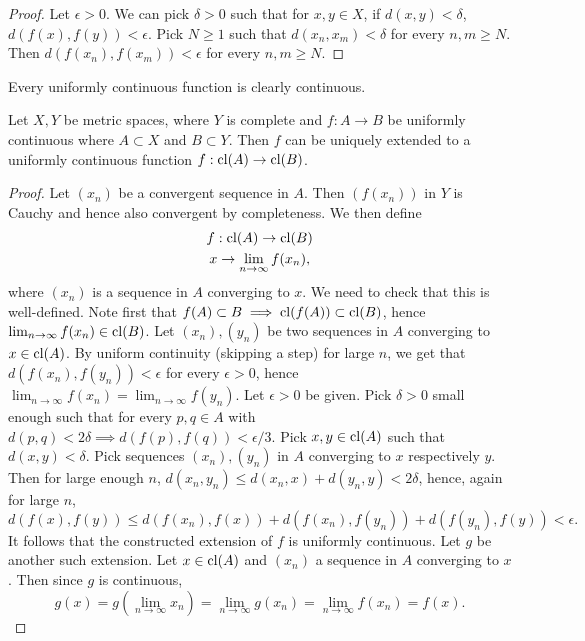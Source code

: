    \begin{proof}
        Let $\epsilon>0$. We can pick $\delta>0$ such that for $x,y\in X$, if $d(x,y)<\delta$, $d(f(x),f(y))<\epsilon$. Pick $N\geq 1$ such that $d(x_n,x_m)<\delta$ for every $n,m\geq N$. Then $d(f(x_n),f(x_m))<\epsilon$ for every $n,m\geq N$. 
    \end{proof}
    \begin{remark}
        Every uniformly continuous function is clearly continuous.
    \end{remark}
    \begin{lemma}
        Let $X,Y$ be metric spaces, where $Y$ is complete and $f:A\rightarrow B$ be uniformly continuous where $A\subset X$ and $B\subset Y$. Then $f$ can be uniquely extended to a uniformly continuous function $f : \mathrm{cl}(A)\rightarrow\mathrm{cl}(B)$.  
    \end{lemma}
    \begin{proof}
        Let $(x_n)$ be a convergent sequence in $A$. Then $(f(x_n))$ in $Y$ is Cauchy and hence also convergent by completeness. We then define 
        \begin{gather*}
            f: \mathrm{cl}(A)\rightarrow \mathrm{cl}(B)\\
            x \rightarrow \lim_{n\to \infty} f(x_n), 
        \end{gather*}
        where $(x_n)$ is a sequence in $A$ converging to $x$. We need to check that this is well-defined. Note first that $f(A)\subset B\implies  \mathrm{cl}(f(A))\subset \mathrm{cl}(B)$, hence $\lim_{n\to\infty} f(x_n)\in \mathrm{cl}(B) $. Let $(x_n),(y_n)$ be two sequences in $A$ converging to $x\in \mathrm{cl}(A)$. By uniform continuity (skipping a step) for large $n$, we get that $d(f(x_n),f(y_n))<\epsilon$ for every $\epsilon>0$, hence $\lim_{n\to \infty} f(x_n) = \lim_{n\to \infty} f(y_n)$. Let $\epsilon>0$ be given. Pick $\delta>0$ small enough such that for every $p,q\in A$ with $d(p,q)<2\delta \implies d(f(p),f(q))<\epsilon/3$. Pick $x,y\in \mathrm{cl}(A)$ such that $d(x,y)<\delta$. Pick sequences $(x_n),(y_n)$ in $A$ converging to $x$ respectively $y$. Then for large enough $n$, $d(x_n,y_n)\leq d(x_n,x)+d(y_n,y)< 2\delta$, hence, again for large $n$, 
        $$d(f(x),f(y))\leq d(f(x_n),f(x))+d(f(x_n),f(y_n))+d(f(y_n),f(y))<\epsilon.$$
        It follows that the constructed extension of $f$ is uniformly continuous. Let $g$ be another such extension. Let $x\in \mathrm{cl}(A)$ and $(x_n)$ a sequence in $A$ converging to $x$. Then since $g$ is continuous,  
        $$g(x)=g(\lim_{n\to \infty} x_n)=\lim_{n\to \infty} g(x_n)=\lim_{n\to\infty} f(x_n)=f(x).$$
    \end{proof}
